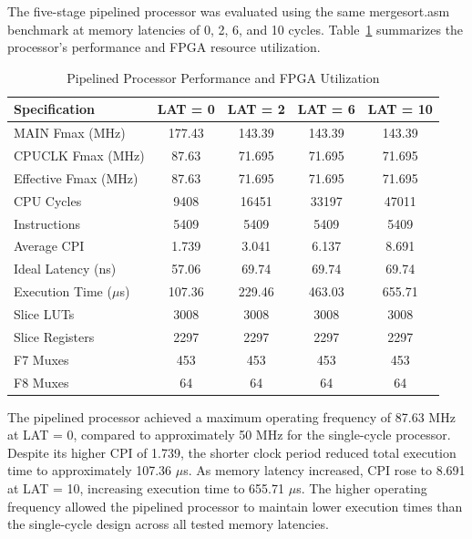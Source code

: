 \documentclass[12pt]{article}
\begin{document}
The five-stage pipelined processor was evaluated using the same mergesort.asm benchmark at memory latencies of 0, 2, 6, and 10 cycles. Table~\ref{tb:pipeline_results} summarizes the processor's performance and FPGA resource utilization.

\begin{table}[H]
    \centering
    \small
    \begin{tabular}{|l|c|c|c|c|}
        \hline
        \textbf{Specification} &
        \textbf{LAT = 0} &
        \textbf{LAT = 2} &
        \textbf{LAT = 6} &
        \textbf{LAT = 10} \\ \hline

        MAIN Fmax (MHz) & 177.43 & 143.39 & 143.39 & 143.39 \\ \hline
        CPUCLK Fmax (MHz) & 87.63 & 71.695 & 71.695 & 71.695 \\ \hline
        Effective Fmax (MHz) & 87.63 & 71.695 & 71.695 & 71.695 \\ \hline
        CPU Cycles & 9408 & 16451 & 33197 & 47011 \\ \hline
        Instructions & 5409 & 5409 & 5409 & 5409 \\ \hline
        Average CPI & 1.739 & 3.041 & 6.137 & 8.691 \\ \hline
        Ideal Latency (ns) & 57.06 & 69.74 & 69.74 & 69.74 \\ \hline
        Execution Time ($\mu$s) & 107.36 & 229.46 & 463.03 & 655.71 \\ \hline
        Slice LUTs & 3008 & 3008 & 3008 & 3008 \\ \hline
        Slice Registers & 2297 & 2297 & 2297 & 2297 \\ \hline
        F7 Muxes & 453 & 453 & 453 & 453 \\ \hline
        F8 Muxes & 64 & 64 & 64 & 64 \\ \hline
    \end{tabular}
    \caption{Pipelined Processor Performance and FPGA Utilization}
    \label{tb:pipeline_results}
\end{table}

The pipelined processor achieved a maximum operating frequency of 87.63 MHz at LAT = 0, compared to approximately 50 MHz for the single-cycle processor. Despite its higher CPI of 1.739, the shorter clock period reduced total execution time to approximately 107.36 $\mu$s. As memory latency increased, CPI rose to 8.691 at LAT = 10, increasing execution time to 655.71 $\mu$s. The higher operating frequency allowed the pipelined processor to maintain lower execution times than the single-cycle design across all tested memory latencies.
\end{document}
